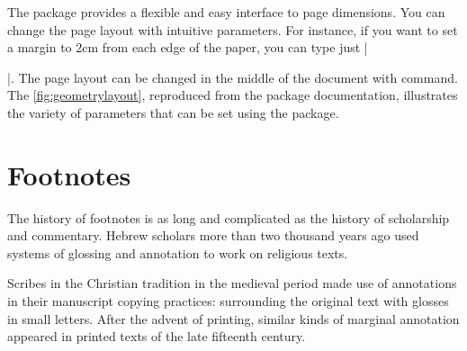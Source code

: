  The  package provides a flexible and easy interface to page dimensions.
 You can change the page layout with intuitive parameters. For instance,
 if you want to set a margin to 2cm from each edge of the paper,
 you can type just |\usepackage[margin=2cm]{geometry}|. 
 The page layout can be changed in the middle of the document
 with  command.  The \ref{fig:geometrylayout}, reproduced from the package documentation, illustrates the variety of parameters that can be set using the package.


\section{Footnotes}
The history of footnotes is as long and complicated as the history of scholarship and commentary. Hebrew scholars more than two thousand years ago used systems of glossing and annotation to work on religious texts. 

Scribes in the Christian tradition in the medieval period made use of annotations in their manuscript copying practices: surrounding the original text with glosses in small letters. After the advent of printing, similar kinds of marginal annotation appeared in printed texts of the late fifteenth century. 

